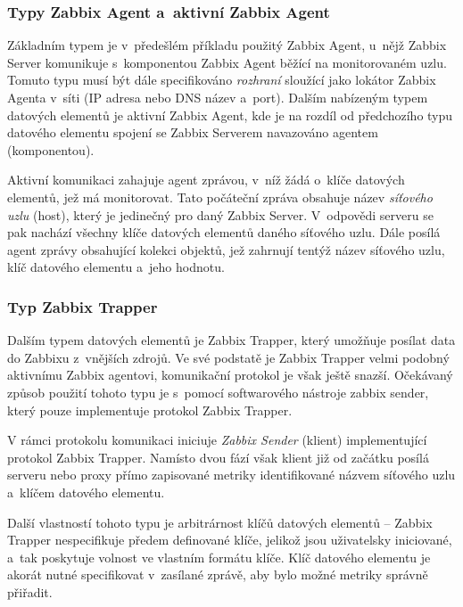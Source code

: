 \documentclass[czech, ing, kiv, he, iso690]{fasthesis}
\begin{document}
\subsubsection{Typy Zabbix Agent a~aktivní Zabbix Agent}
Základním typem je v~předešlém příkladu použitý Zabbix Agent, u~nějž Zabbix Server komunikuje s~komponentou Zabbix Agent běžící na monitorovaném uzlu. Tomuto typu musí být dále specifikováno \emph{rozhraní} sloužící jako lokátor Zabbix Agenta v~síti (IP adresa nebo DNS název a~port).  Dalším nabízeným typem datových elementů je aktivní Zabbix Agent, kde je na rozdíl od předchozího typu datového elementu spojení se Zabbix Serverem navazováno agentem (komponentou).

Aktivní komunikaci zahajuje agent zprávou, v~níž žádá o~klíče datových elementů, jež má monitorovat. Tato počáteční zpráva obsahuje název \emph{síťového uzlu} (host), který je jedinečný pro daný Zabbix Server. V~odpovědi serveru se pak nachází všechny klíče datových elementů daného síťového uzlu. Dále posílá agent zprávy obsahující kolekci objektů, jež zahrnují tentýž název síťového uzlu, klíč datového elementu a~jeho hodnotu. 


\subsubsection{Typ Zabbix Trapper}
Dalším typem datových elementů je Zabbix Trapper, který umožňuje posílat data do Zabbixu z~vnějších zdrojů. Ve své podstatě je Zabbix Trapper velmi podobný aktivnímu Zabbix agentovi, komunikační protokol je však ještě snazší. Očekávaný způsob použití tohoto typu je s~pomocí softwarového nástroje zabbix sender, který pouze implementuje protokol Zabbix Trapper. 

V rámci protokolu komunikaci iniciuje \emph{Zabbix Sender} (klient) implementující protokol Zabbix Trapper. Namísto dvou fází však klient již od začátku posílá serveru nebo proxy přímo zapisované metriky identifikované názvem síťového uzlu a~klíčem datového elementu.


Další vlastností tohoto typu je arbitrárnost klíčů datových elementů -- Zabbix Trapper nespecifikuje předem definované klíče, jelikož jsou uživatelsky iniciované, a~tak poskytuje volnost ve vlastním formátu klíče. Klíč datového elementu je akorát nutné specifikovat v~zasílané zprávě, aby bylo možné metriky správně přiřadit.
\end{document}
